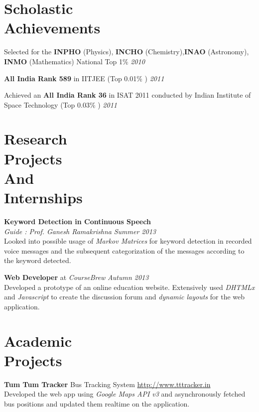 \documentclass[margin,10pt]{resume}
\begin{document}
\begin{resume}

\vspace{15mm}

\section{\mysidestyle Scholastic\\Achievements}

\begin{list2}
\item Selected for the \textbf{INPHO} (Physics), \textbf{INCHO} (Chemistry),\textbf{INAO} (Astronomy), \textbf{ INMO} (Mathematics) National Top 1\% \hfill \emph{2010}
\item \textbf{All India Rank 589} in IITJEE (Top 0.01\% ) \hfill \emph{2011}
\item Achieved an \textbf{All India Rank 36} in ISAT 2011 conducted by Indian Institute of Space Technology (Top 0.03\% )
\hfill \emph{2011}
\end{list2}
\section{\mysidestyle Research\\Projects\\And\\Internships }
\textbf{Keyword Detection in Continuous Speech} \\
    \textsl{Guide : Prof. Ganesh Ramakrishna} \hfill \emph{Summer 2013} \\
     Looked into possible usage of \emph{Markov Matrices} for keyword detection in recorded voice messages and the subsequent categorization of the messages according to the keyword detected.

\textbf{Web Developer} at \emph{CourseBrew} \hfill \emph{Autumn 2013} \\
Developed a prototype of an online education website. Extensively used \emph{DHTMLx} and \emph{Javascript} to create the discussion forum and \emph{dynamic layouts} for the web application.

\section{\mysidestyle Academic\\Projects}

\textbf{Tum Tum Tracker} \hfill Bus Tracking System \hfill
    \url{http://www.tttracker.in} \\
 Developed the web app using \emph{Google Maps API v3} and asynchronously fetched bus positions and updated them realtime  on the application.


\end{resume}
\end{document}
